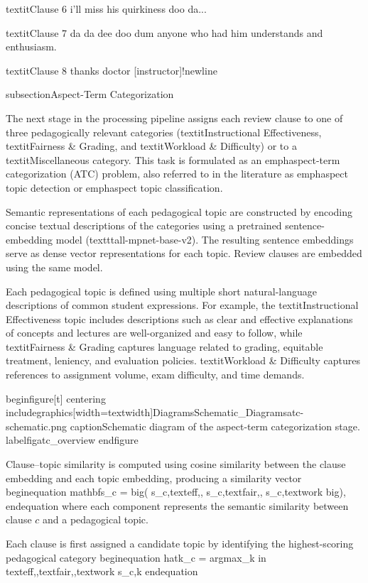 textit{Clause 6}
i'll miss his quirkiness doo da...

textit{Clause 7}
da da dee doo dum anyone who had him understands and enthusiasm.

textit{Clause 8}
thanks doctor [instructor]!newline

subsection{Aspect-Term Categorization}

The next stage in the processing pipeline assigns each review clause to one of three pedagogically relevant categories (textit{Instructional Effectiveness}, textit{Fairness & Grading}, and textit{Workload & Difficulty}) or to a textit{Miscellaneous} category. This task is formulated as an emph{aspect-term categorization} (ATC) problem, also referred to in the literature as emph{aspect topic detection} or emph{aspect topic classification}.

Semantic representations of each pedagogical topic are constructed by encoding concise textual descriptions of the categories using a pretrained sentence-embedding model (texttt{all-mpnet-base-v2}). The resulting sentence embeddings serve as dense vector representations for each topic. Review clauses are embedded using the same model.

Each pedagogical topic is defined using multiple short natural-language descriptions of common student expressions. For example, the
textit{Instructional Effectiveness} topic includes descriptions such as clear and effective explanations of concepts and lectures are well-organized and easy to follow, while textit{Fairness & Grading} captures language related to grading, equitable treatment, leniency, and evaluation policies. textit{Workload & Difficulty} captures references to assignment volume, exam difficulty, and time demands.

begin{figure}[t]
    centering
    includegraphics[width=textwidth]{DiagramsSchematic_Diagramsatc-schematic.png}
    caption{Schematic diagram of the aspect-term categorization stage.}
    label{figatc_overview}
end{figure}

Clause–topic similarity is computed using cosine similarity between the clause embedding and each topic embedding, producing a similarity vector
begin{equation}
mathbf{s}_c = big( s_{c,text{eff}},, s_{c,text{fair}},, s_{c,text{work}} big),
end{equation}
where each component represents the semantic similarity between clause $c$ and a pedagogical topic.

Each clause is first assigned a candidate topic by identifying the highest-scoring pedagogical category
begin{equation}
hat{k}_c = argmax_{k in {text{eff},,text{fair},,text{work}}} s_{c,k}
end{equation}

